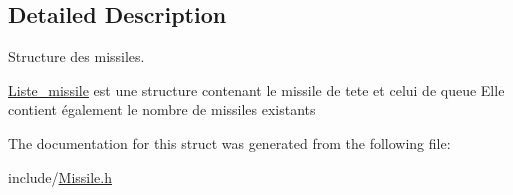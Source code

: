 \subsection{Detailed Description}
Structure des missiles. 

\hyperlink{struct_liste__missile}{Liste\+\_\+missile} est une structure contenant le missile de tete et celui de queue Elle contient également le nombre de missiles existants 

The documentation for this struct was generated from the following file\+:\begin{DoxyCompactItemize}
\item 
include/\hyperlink{_missile_8h}{Missile.\+h}\end{DoxyCompactItemize}
